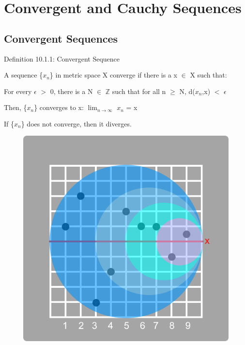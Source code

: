 \newpage

\section[Day 10: Convergence \& Cauchy Sequences]{Convergent and Cauchy Sequences}

\subsection{ Convergent Sequences }

{ \color{blue} Definition 10.1.1: Convergent Sequence } 

    \begin{adjustbox}{minipage=14cm, right, vspace=0.1cm 0cm}
        A sequence \{$x_n$\} in metric space X converge if
        there is a x $\in$ X such that:

        \hspace{1cm}
        For every $\epsilon$ $>$ 0, there is a N $\in$ $\mathbb{Z}$ such that
        for all n $\geq$ N, d($x_n$,x) $<$ $\epsilon$
        
        Then, \{$x_n$\} converges to x: \hspace{1cm}
        $\lim_{n \rightarrow \infty}$ $x_n$ = x

        If \{$x_n$\} does not converge, then it diverges.
	\end{adjustbox}

\begin{figure}[h]
	\centering
	\includegraphics[scale=0.3]{Images/10.1.1.png}
\end{figure}

